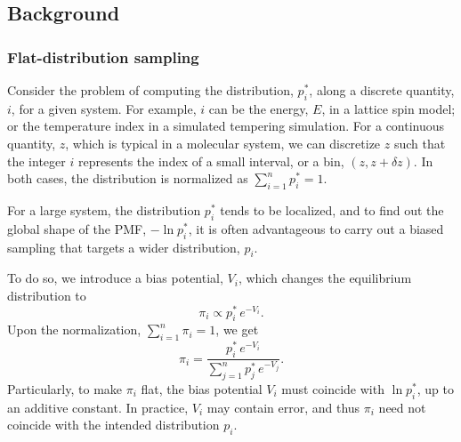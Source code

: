\documentclass[reprint, floatfix]{revtex4-1}
\begin{document}
\subsection{\label{sec:background}
Background}



\subsubsection{\label{sec:FDS}
Flat-distribution sampling}



Consider the problem of computing
the distribution, $p^*_i$,
along a discrete quantity, $i$,
for a given system.
%
%
For example, $i$ can be the energy, $E$,
in a lattice spin model; or the temperature index
in a simulated tempering simulation\cite{
marinari1992, lyubartsev1992}.
%
For a continuous quantity, $z$,
which is typical in a molecular system,
we can discretize $z$
such that the integer $i$ represents
the index of a small interval, or a bin,
$(z, z + \delta z)$.
%
In both cases,
the distribution is normalized as
$\sum_{i = 1}^n p^*_i = 1$.



For a large system,
the distribution $p^*_i$ tends to
be localized,
%
and to find out the global shape
of the PMF, $-\ln p^*_i$,
it is often advantageous to carry out
a biased sampling that targets
a wider distribution, $p_i$.
%



To do so, we introduce a bias potential, $V_i$,
which changes the equilibrium distribution to
%
\begin{equation}
  \pi_i \propto p^*_i \, e^{-V_i}.
  \label{eq:pi_p_phi1}
\end{equation}
%
Upon the normalization,
$\sum_{i = 1}^n \pi_i = 1$,
we get
%
\begin{equation}
  \pi_i
  =
  \frac{                p^*_i \, e^{-V_i} }
       { \sum_{j = 1}^n p^*_j \, e^{-V_j} }
  .
  \label{eq:pi_p_phi}
\end{equation}
%
Particularly,
to make $\pi_i$ flat,
the bias potential $V_i$
must coincide with $\ln p^*_i$,
up to an additive constant.
%
In practice, $V_i$ may contain error,
and thus $\pi_i$ need not
coincide with the intended distribution $p_i$.
\end{document}
